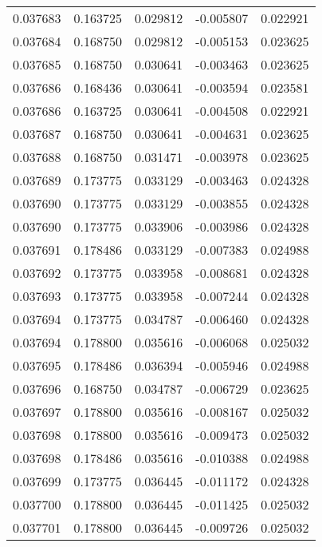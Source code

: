 \begin{tabular}{lrrrr}
0.037683    &  0.163725 &  0.029812 & -0.005807 &             0.022921 \\
0.037684    &  0.168750 &  0.029812 & -0.005153 &             0.023625 \\
0.037685    &  0.168750 &  0.030641 & -0.003463 &             0.023625 \\
0.037686    &  0.168436 &  0.030641 & -0.003594 &             0.023581 \\
0.037686    &  0.163725 &  0.030641 & -0.004508 &             0.022921 \\
0.037687    &  0.168750 &  0.030641 & -0.004631 &             0.023625 \\
0.037688    &  0.168750 &  0.031471 & -0.003978 &             0.023625 \\
0.037689    &  0.173775 &  0.033129 & -0.003463 &             0.024328 \\
0.037690    &  0.173775 &  0.033129 & -0.003855 &             0.024328 \\
0.037690    &  0.173775 &  0.033906 & -0.003986 &             0.024328 \\
0.037691    &  0.178486 &  0.033129 & -0.007383 &             0.024988 \\
0.037692    &  0.173775 &  0.033958 & -0.008681 &             0.024328 \\
0.037693    &  0.173775 &  0.033958 & -0.007244 &             0.024328 \\
0.037694    &  0.173775 &  0.034787 & -0.006460 &             0.024328 \\
0.037694    &  0.178800 &  0.035616 & -0.006068 &             0.025032 \\
0.037695    &  0.178486 &  0.036394 & -0.005946 &             0.024988 \\
0.037696    &  0.168750 &  0.034787 & -0.006729 &             0.023625 \\
0.037697    &  0.178800 &  0.035616 & -0.008167 &             0.025032 \\
0.037698    &  0.178800 &  0.035616 & -0.009473 &             0.025032 \\
0.037698    &  0.178486 &  0.035616 & -0.010388 &             0.024988 \\
0.037699    &  0.173775 &  0.036445 & -0.011172 &             0.024328 \\
0.037700    &  0.178800 &  0.036445 & -0.011425 &             0.025032 \\
0.037701    &  0.178800 &  0.036445 & -0.009726 &             0.025032 \\

\end{tabular}
